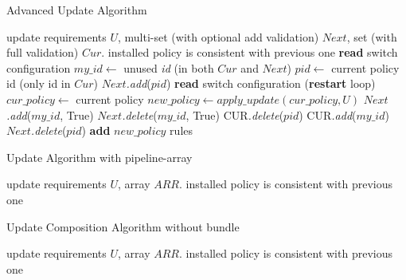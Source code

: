 \documentclass[conference]{sigcomm-alternate}
\begin{document}
\begin{algorithm}[t]
    \caption{Advanced Update Algorithm}
    \label{alg:update}
    \begin{algorithmic}[1]
    \Require update requirements $U$, multi-set (with optional add validation) $Next$, set (with full validation) $Cur$.
    \Ensure installed policy is consistent with previous one
 		\Repeat
 			\State \textbf{read} switch configuration
 			\State $my\_id\gets$ unused \emph{id} (in both $Cur$ and $Next$)
 			\State $pid\gets$ current policy id (only id in $Cur$)
 			\State $Next$\emph{.add}($pid$)
 			\State \textbf{read} switch configuration
 				 (\textbf{restart} loop)
 			\EndIf
 			\State $cur\_policy\gets$ current policy
 			\State $new\_policy\gets apply\_update(cur\_policy,U)$
 			\startTransaction
 				\State $Next$\emph{.add}($my\_id$, True)
 				\State $Next$\emph{.delete}($my\_id$, True)
	 			\State CUR\emph{.delete}($pid$)
	 			\State CUR\emph{.add}($my\_id$)
				\State $Next$\emph{.delete}($pid$)
	 			\State \textbf{add} $new\_policy$ rules %
 			\endTransaction
			\Return

    \end{algorithmic}
\end{algorithm}


\begin{algorithm}[t]
    \caption{Update Algorithm with pipeline-array}
    \label{alg:template}
    \begin{algorithmic}[1]
    \Require update requirements $U$, array $ARR$.
    \Ensure installed policy is consistent with previous one
			\Return

    \end{algorithmic}
\end{algorithm}

\begin{algorithm}[t]
    \caption{Update Composition Algorithm without bundle}
    \label{alg:template}
    \begin{algorithmic}[1]
    \Require update requirements $U$, array $ARR$.
    \Ensure installed policy is consistent with previous one
			\Return

    \end{algorithmic}
\end{algorithm}
\end{document}
